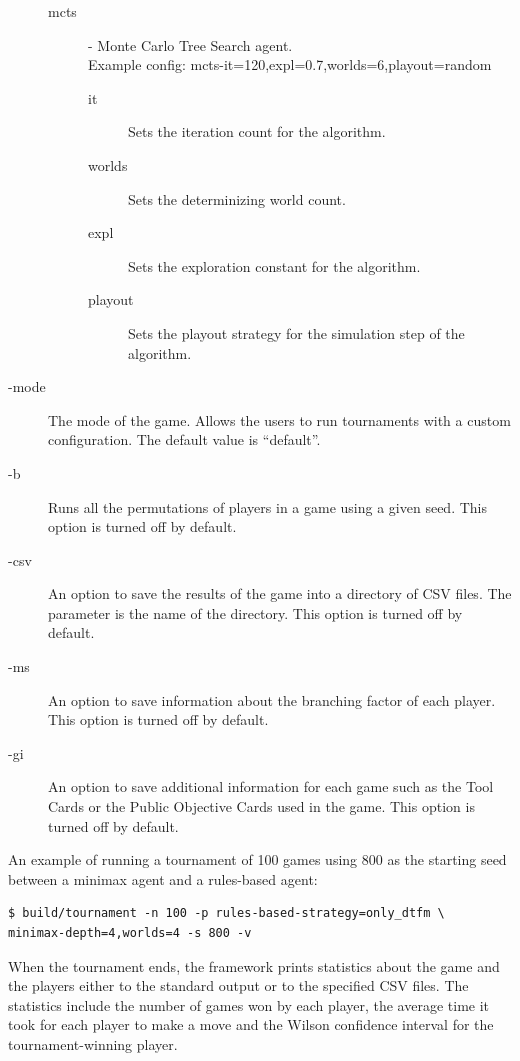 \begin{description}
\begin{description}
\begin{description}
          \end{description}
        \item[mcts] - Monte Carlo Tree Search agent. \\Example config: mcts-it=120,expl=0.7,worlds=6,playout=random
          \begin{description}
            \item[it] Sets the iteration count for the algorithm.
            \item[worlds] Sets the determinizing world count.
            \item[expl] Sets the exploration constant for the algorithm.
            \item[playout] Sets the playout strategy for the simulation step of the algorithm.
          \end{description} 
      \end{description}
    
    \item[-mode] The mode of the game. Allows the users to run tournaments with a custom configuration. The default value is ``default''.\\
    \item[-b] Runs all the permutations of players in a game using a given seed. This option is turned off by default.\\
    \item[-csv] An option to save the results of the game into a directory of CSV files. The parameter is the name of the directory. This option is turned off by default.\\
    \item[-ms] An option to save information about the branching factor of each player. This option is turned off by default.\\
    \item[-gi] An option to save additional information for each game such as the Tool Cards or the Public Objective Cards used in the game. This option is turned off by default.\\ 
\end{description}
  
An example of running a tournament of 100 games using 800 as the starting seed between a minimax agent and a rules-based agent:
\begin{verbatim}
$ build/tournament -n 100 -p rules-based-strategy=only_dtfm \ 
minimax-depth=4,worlds=4 -s 800 -v
\end{verbatim}
  

When the tournament ends, the framework prints statistics about the game and the players either to the standard output or to the specified CSV files. The statistics include
the number of games won by each player, the average time it took for each player to make a move and the Wilson confidence interval for the tournament-winning player.

